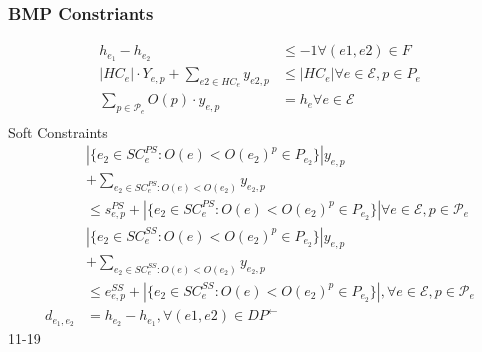 \documentclass{article}
\newcommand{\scriptP}{\mathcal{P}}
\newcommand{\scriptR}{\mathcal{R}}
\newcommand{\scriptE}{\mathcal{E}}
\begin{document}
\subsubsection{BMP Constriants}

\begin{align}
    h_{e_1} - h_{e_2} &\le -1 \forall(e1, e2) \in F \\
    |HC_{e}| \cdot Y_{e,p} + \sum_{e2 \in HC_e}y_{e2, p} &\le |HC_{e}| \forall e\in \scriptE, p \in P_{e} \\
    \sum_{p\in \scriptP_e}O(p) \cdot y_{e,p} &= h_{e} \forall e \in \scriptE \\
\end{align}
Soft Constraints
\begin{align}
    &|\{e_2 \in SC_e^{PS}: O(e) < O(e_2) ^ p \in P_{e_2}\}| y_{e,p} \nonumber \\
    &+ \sum_{e_2 \in SC^{PS}_e : O(e) < O(e_2)} y_{e_2, p} \nonumber\\
    &\le s^{PS}_{e,p} + |\{e_2 \in SC_e^{PS}: O(e) < O(e_2) ^ p \in P_{e_2}\}| \forall e \in \scriptE, p \in \scriptP_e \\
    &|\{e_2 \in SC_e^{SS}: O(e) < O(e_2) ^ p \in P_{e_2}\}| y_{e,p} \nonumber\\ 
    &+ \sum_{e_2\in SC_e^{SS}:O(e)<O(e_2)} y_{e_2, p} \nonumber\\
    &\le e^{SS}_{e,p} + |\{e_2 \in SC_e^{SS}: O(e) < O(e_2) ^ p \in P_{e_2}\}|, \forall e \in \scriptE, p \in \scriptP_e \\
    d_{e_1, e_2} &= h_{e_2} - h_{e_1}, \forall (e1, e2) \in DP^{\leftarrow}
\end{align}
11-19
\end{document}
